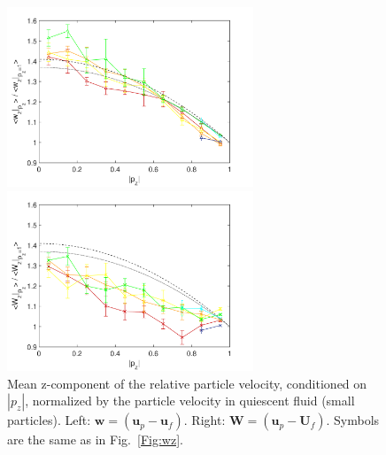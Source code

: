 \documentclass[]{jfm}
\begin{document}
\begin{figure}
\centering
\begin{minipage}{.5\textwidth}
  \centering
  \includegraphics[width=2.9in]{figures/wz-local-norm-small.pdf}
\end{minipage}%
\begin{minipage}{.5\textwidth}
  \centering
  \includegraphics[width=2.9in]{figures/wz-U-norm-small.pdf}
\end{minipage}
\caption{Mean z-component of the relative particle velocity, conditioned on $|p_z|$, normalized by the particle velocity in quiescent fluid (small particles). Left: $\mathbf{w}{=}(\mathbf{u}_p{-}\mathbf{u}_f)$. Right: $\mathbf{W}{=}(\mathbf{u}_p{-}\mathbf{U}_f)$. Symbols are the same as in Fig.~\ref{Fig:wz}. }
\label{Fig:wz-norm}
\end{figure}
\end{document}
